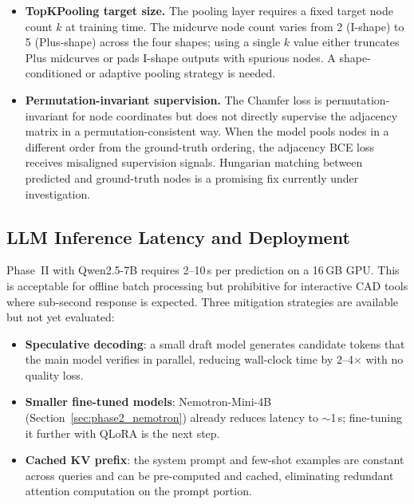 \documentclass[journal]{IEEEtran}
\begin{document}
\begin{itemize}
  \item \textbf{TopKPooling target size.}  The pooling layer requires a fixed
        target node count $k$ at training time.  The midcurve node count varies
        from 2 (I-shape) to 5 (Plus-shape) across the four shapes; using a
        single $k$ value either truncates Plus midcurves or pads I-shape
        outputs with spurious nodes.  A shape-conditioned or adaptive pooling
        strategy is needed.

  \item \textbf{Permutation-invariant supervision.}  The Chamfer loss is
        permutation-invariant for node coordinates but does not directly
        supervise the adjacency matrix in a permutation-consistent way.
        When the model pools nodes in a different order from the ground-truth
        ordering, the adjacency BCE loss receives misaligned supervision signals.
        Hungarian matching between predicted and ground-truth nodes is a
        promising fix currently under investigation.
\end{itemize}

\subsection{LLM Inference Latency and Deployment}

Phase~II with Qwen2.5-7B requires 2--10\,s per prediction on a 16\,GB GPU.
This is acceptable for offline batch processing but prohibitive for interactive
CAD tools where sub-second response is expected.  Three mitigation strategies
are available but not yet evaluated:

\begin{itemize}
  \item \textbf{Speculative decoding}: a small draft model generates candidate
        tokens that the main model verifies in parallel, reducing wall-clock
        time by 2--4$\times$ with no quality loss.
  \item \textbf{Smaller fine-tuned models}: Nemotron-Mini-4B
        (Section~\ref{sec:phase2_nemotron}) already reduces latency to
        $\sim$1\,s; fine-tuning it further with QLoRA is the next step.
  \item \textbf{Cached KV prefix}: the system prompt and few-shot examples are
        constant across queries and can be pre-computed and cached, eliminating
        redundant attention computation on the prompt portion.
\end{itemize}
\end{document}
